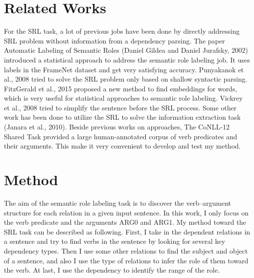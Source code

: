 \documentclass[letterpaper]{article}
\begin{document}
\section{Related Works}
For the SRL task, a lot of previous jobs have been done by directly addressing SRL problem without information from a dependency parsing. The paper Automatic Labeling of Semantic Roles (Daniel Gildea and Daniel Jurafsky, 2002)\cite{Gildea:2002:ALS:643092.643093} introduced a statistical approach to address the semantic role labeling job. It uses labels in the FrameNet dataset\cite{Baker:1998:BFP:980845.980860} and get very satisfying accuracy. Punyakanok et al., 2008 tried to solve the SRL problem only based on shallow syntactic parsing\cite{Punyakanok}. FitzGerald et al., 2015 proposed a new method to find embeddings for words, which is very useful for statistical approaches to semantic role labeling\cite{FitzGerald2015SemanticRL}. Vickrey et al., 2008 tried to simplify the sentence before the SRL process\cite{Vickrey:2008:ASS:1596324.1596373}. Some other work has been done to utilize the SRL to solve the information extraction task (Janara et al., 2010)\cite{Christensen:2010:SRL:1866775.1866782}. Beside previous works on approaches, The CoNLL-12 Shared Task provided a large human-annotated corpus of verb predicates and their arguments\cite{pradhan-etal-conll-st-2012-ontonotes}. This make it very convenient to develop and test my method.




\section{Method}
The aim of the semantic role labeling task is to discover the verb–argument structure for each relation in a given input sentence. In this work, I only focus on the verb predicate and the arguments ARG0 and ARG1. My method toward the SRL task can be described as following. First, I take in the dependent relations in a sentence and try to find verbs in the sentence by looking for several key dependency types. Then I use some other relations to find the subject and object of a sentence, and also I use the type of relations to infer the role of them toward the verb. At last, I use the dependency to identify the range of the role.
\end{document}
